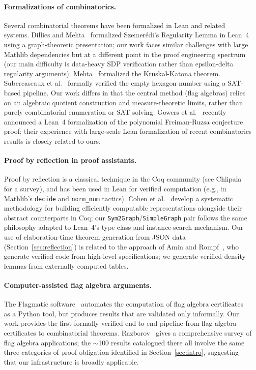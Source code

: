 \documentclass{article}
\newcommand{\lean}[1]{\texttt{#1}}
\begin{document}
\paragraph{Formalizations of combinatorics.}
Several combinatorial theorems have been formalized in Lean and related
systems.  Dillies and Mehta~\cite{dillies2022szemeredi} formalized
Szemer\'edi's Regularity Lemma in Lean~4 using a graph-theoretic presentation;
our work faces similar challenges with large Mathlib dependencies but at a
different point in the proof engineering spectrum (our main difficulty is
data-heavy SDP verification rather than epsilon-delta regularity arguments).
Mehta~\cite{mehta2022kruskal} formalized the Kruskal-Katona theorem.
Subercaseaux et al.~\cite{subercaseaux2024hexagon}
formally verified the empty hexagon number using a SAT-based pipeline.  Our
work differs in that the central method (flag algebras) relies on an algebraic
quotient construction and measure-theoretic limits, rather than purely
combinatorial enumeration or SAT solving.
Gowers et al.~\cite{gowers2024formalizing} recently announced a Lean~4
formalization of the polynomial Freiman-Ruzsa conjecture proof; their experience
with large-scale Lean formalization of recent combinatorics results is closely
related to ours.

\paragraph{Proof by reflection in proof assistants.}
Proof by reflection is a classical technique in the Coq community (see
Chlipala~\cite{chlipala2013cpdt} for a survey), and has been used
in Lean for verified computation (e.g., in Mathlib's \lean{decide} and
\lean{norm\_num} tactics).  Cohen et al.~\cite{cohen2013refinements}
develop a systematic methodology for building efficiently computable
representations alongside their abstract counterparts in Coq; our
\lean{Sym2Graph}/\lean{SimpleGraph} pair follows the same philosophy
adapted to Lean~4's type-class and instance-search mechanism.
Our use of elaboration-time theorem generation from JSON data (Section~\ref{sec:reflection})
is related to the approach of Amin and Rompf~\cite{amin2017collapsing},
who generate verified code from high-level specifications; we generate
verified density lemmas from externally computed tables.

\paragraph{Computer-assisted flag algebra arguments.}
The Flagmatic software~\cite{vaughan2013flagmatic} automates the
computation of flag algebra certificates as a Python tool, but produces results
that are validated only informally.  Our work provides the first formally
verified end-to-end pipeline from flag algebra certificates to combinatorial
theorems.  Razborov~\cite{razborov2013flag} gives a comprehensive survey of
flag algebra applications; the $\sim$100 results catalogued there all involve
the same three categories of proof obligation identified in
Section~\ref{sec:intro}, suggesting that our infrastructure is broadly applicable.
\end{document}
